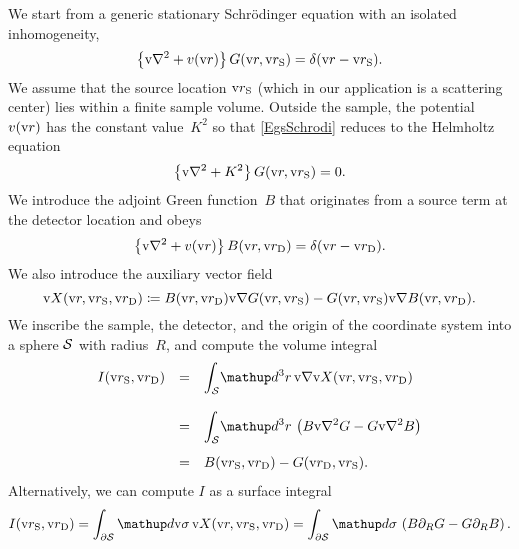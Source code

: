 We start from a generic stationary Schrödinger equation
with an isolated inhomogeneity,
\begin{equation}\label{EgsSchrodi}
  \left\{\text{v}{\nabla}^2+v(\text{v}{r})\right\}G(\text{v}{r},\text{v}{r}_\text{S}) = \delta(\text{v}{r}-\text{v}{r}_\text{S}).
\end{equation}
We assume that the source location $\text{v}{r}_\text{S}$
(which in our application is a scattering center)
lies within a finite sample volume.
Outside the sample, the potential~$v(\text{v}{r})$ has the constant value~$K^2$
so that \cref{EgsSchrodi}
reduces to the Helmholtz equation%
\begin{equation}\label{EgsSchrodiHelmh}
  \left\{\text{v}{\nabla}^2+K^2\right\}G(\text{v}{r},\text{v}{r}_\text{S}) = 0.
\end{equation}
We introduce the adjoint Green function~$B$
that originates from a source term at the detector location
and obeys
\begin{equation}\label{EgsSchrodiAdj}
  \left\{\text{v}{\nabla}^2+v(\text{v}{r})\right\}B(\text{v}{r},\text{v}{r}_\text{D}) = \delta(\text{v}{r}-\text{v}{r}_\text{D}).
\end{equation}
We also introduce the auxiliary vector field
\begin{equation}
  \text{v}{X}(\text{v}{r},\text{v}{r}_\text{S},\text{v}{r}_\text{D})\coloneqq B(\text{v}{r},\text{v}{r}_\text{D})\text{v}{\nabla} G(\text{v}{r},\text{v}{r}_\text{S}) - G(\text{v}{r},\text{v}{r}_\text{S})\text{v}{\nabla} B(\text{v}{r},\text{v}{r}_\text{D}).
\end{equation}
We inscribe the sample, the detector, and the origin of the coordinate system
into a sphere $\mathcal{S}$ with radius~$R$,
and compute the volume integral
\begin{equation}\label{Eprerecipro}
  \begin{array}{lcl}
    I(\rS,\rD)
  &=& \displaystyle\int_\Sphere\!\d^3r\,\Nabla \v{X}(\r,\rS,\rD)
  \\[1.8em]
  &=& \displaystyle\int_\Sphere\!\d^3r\,\left(
    B\Nabla^2 G- G\Nabla^2 B \right)
  \\[1.4em]
  &=&  B(\rS,\rD) - G(\rD,\rS).
  \end{array}
\end{equation}
Alternatively, we can compute $I$ as a surface integral
\begin{equation}
  I(\rS,\rD)
  =\displaystyle\int_{\partial\Sphere}\d\v{\sigma}\,\v{X}(\r,\rS,\rD)
  =\displaystyle\int_{\partial\Sphere}\d{\sigma}\,
       \left(B\partial_R G - G\partial_R B\right).
\end{equation}
